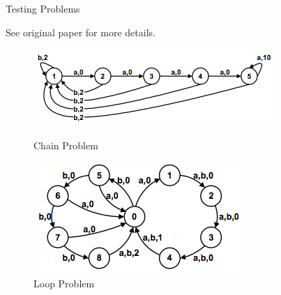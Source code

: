 \documentclass{beamer}
\begin{document}
\begin{frame}{Testing Problems}

See original paper \cite{strens} for more details.
\begin{figure}
\centering
\begin{minipage}{0.5\textwidth}
\includegraphics[width=\textwidth]{chain.png}
\caption{Chain Problem}
\end{minipage}%
\begin{minipage}{0.5\textwidth}
\includegraphics[width=\textwidth]{loop.png}
\caption{Loop Problem}
\end{minipage}%
\end{figure}


\end{frame}
\end{document}
